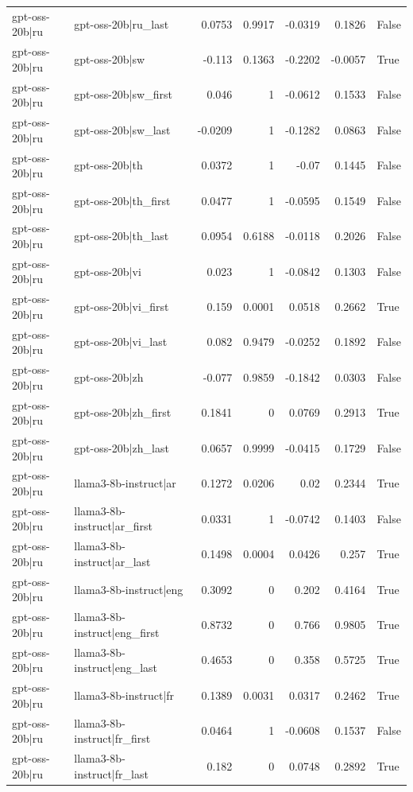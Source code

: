 \begin{table}
\begin{tabular}{l l r r r r l}
gpt-oss-20b|ru & gpt-oss-20b|ru_last & 0.0753 & 0.9917 & -0.0319 & 0.1826 & False \\
gpt-oss-20b|ru & gpt-oss-20b|sw & -0.113 & 0.1363 & -0.2202 & -0.0057 & True \\
gpt-oss-20b|ru & gpt-oss-20b|sw_first & 0.046 & 1 & -0.0612 & 0.1533 & False \\
gpt-oss-20b|ru & gpt-oss-20b|sw_last & -0.0209 & 1 & -0.1282 & 0.0863 & False \\
gpt-oss-20b|ru & gpt-oss-20b|th & 0.0372 & 1 & -0.07 & 0.1445 & False \\
gpt-oss-20b|ru & gpt-oss-20b|th_first & 0.0477 & 1 & -0.0595 & 0.1549 & False \\
gpt-oss-20b|ru & gpt-oss-20b|th_last & 0.0954 & 0.6188 & -0.0118 & 0.2026 & False \\
gpt-oss-20b|ru & gpt-oss-20b|vi & 0.023 & 1 & -0.0842 & 0.1303 & False \\
gpt-oss-20b|ru & gpt-oss-20b|vi_first & 0.159 & 0.0001 & 0.0518 & 0.2662 & True \\
gpt-oss-20b|ru & gpt-oss-20b|vi_last & 0.082 & 0.9479 & -0.0252 & 0.1892 & False \\
gpt-oss-20b|ru & gpt-oss-20b|zh & -0.077 & 0.9859 & -0.1842 & 0.0303 & False \\
gpt-oss-20b|ru & gpt-oss-20b|zh_first & 0.1841 & 0 & 0.0769 & 0.2913 & True \\
gpt-oss-20b|ru & gpt-oss-20b|zh_last & 0.0657 & 0.9999 & -0.0415 & 0.1729 & False \\
gpt-oss-20b|ru & llama3-8b-instruct|ar & 0.1272 & 0.0206 & 0.02 & 0.2344 & True \\
gpt-oss-20b|ru & llama3-8b-instruct|ar_first & 0.0331 & 1 & -0.0742 & 0.1403 & False \\
gpt-oss-20b|ru & llama3-8b-instruct|ar_last & 0.1498 & 0.0004 & 0.0426 & 0.257 & True \\
gpt-oss-20b|ru & llama3-8b-instruct|eng & 0.3092 & 0 & 0.202 & 0.4164 & True \\
gpt-oss-20b|ru & llama3-8b-instruct|eng_first & 0.8732 & 0 & 0.766 & 0.9805 & True \\
gpt-oss-20b|ru & llama3-8b-instruct|eng_last & 0.4653 & 0 & 0.358 & 0.5725 & True \\
gpt-oss-20b|ru & llama3-8b-instruct|fr & 0.1389 & 0.0031 & 0.0317 & 0.2462 & True \\
gpt-oss-20b|ru & llama3-8b-instruct|fr_first & 0.0464 & 1 & -0.0608 & 0.1537 & False \\
gpt-oss-20b|ru & llama3-8b-instruct|fr_last & 0.182 & 0 & 0.0748 & 0.2892 & True \\

\end{tabular}
\end{table}
